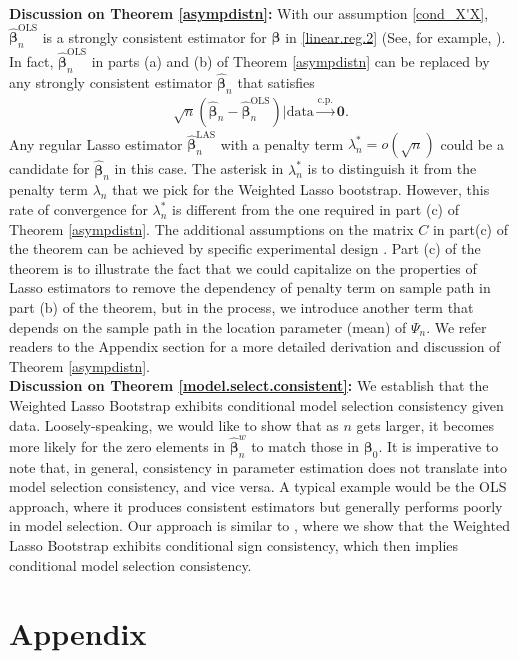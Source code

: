 \documentclass[12pt]{article}
\newcommand{\bnw}{\widehat{\bm{\beta}}_n^w} %
\newcommand{\bhat}{\widehat{\bm{\beta}}_n} %
\newcommand{\bLAS}{\widehat{\bm{\beta}}_n^{\text{LAS}}} %
\newcommand{\bLS}{\widehat{\bm{\beta}}_n^{\text{OLS}}} %
\newcommand{\be}{\bm{\beta}} %
\newcommand{\CONV}[1]{\stackrel{\text{#1}}{\longrightarrow}} %
\begin{document}
\textbf{Discussion on Theorem \ref{asympdistn}:} With our assumption \eqref{cond_X'X}, $\bLS$ is a strongly consistent estimator for $\be$ in \eqref{linear.reg.2} (See, for example, \citet{LSEstrong}). In fact, $\bLS$ in parts (a) and (b) of Theorem \ref{asympdistn} can be replaced by any strongly consistent estimator $\bhat$ that satisfies
\begin{align} \label{LAS.OLS.shrink.rate}
	\sqrt{n} 
	\left(
		\bhat - \bLS
	\right)
	\bigg| \text{data}
	\CONV{c.p.} \bm{0}.
\end{align}
Any regular Lasso estimator $\bLAS$ with a penalty term $\lambda_n^* =  o( \sqrt{n} )$ could be a candidate for $\bhat$ in this case. The asterisk in $\lambda_n^*$ is to distinguish it from the penalty term $\lambda_n$ that we pick for the Weighted Lasso bootstrap. However, this rate of convergence for $\lambda_n^*$ is different from the one required in part (c) of Theorem \ref{asympdistn}. The additional assumptions on the matrix $C$ in part(c) of the theorem can be achieved by specific experimental design \citep{Chatterjee&Lahiri}. Part (c) of the theorem is to illustrate the fact that we could capitalize on the properties of Lasso estimators to remove the dependency of penalty term on sample path in part (b) of the theorem, but in the process, we introduce another term that depends on the sample path in the location parameter (mean) of $\Psi_n$. We refer readers to the Appendix section for a more detailed derivation and discussion of Theorem \ref{asympdistn}. \\

\textbf{Discussion on Theorem \ref{model.select.consistent}:} We establish that the Weighted Lasso Bootstrap exhibits conditional model selection consistency given data. Loosely-speaking, we would like to show that as $n$ gets larger, it becomes more likely for the zero elements in $\bnw$ to match those in $\be_0$. It is imperative to note that, in general, consistency in parameter estimation does not translate into model selection consistency, and vice versa. A typical example would be the OLS approach, where it produces consistent estimators but generally performs poorly in model selection. Our approach is similar to \citet{BinYu}, where we show that the Weighted Lasso Bootstrap exhibits conditional sign consistency, which then implies conditional model selection consistency.  

\section{Appendix}
\end{document}
